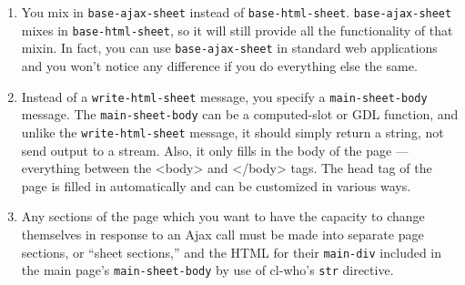 \documentclass [11pt]{book}
\begin{document}
\begin{enumerate}

\item You mix in \texttt{base-ajax-sheet} instead of \texttt{base-html-sheet}. \texttt{base-ajax-sheet} mixes in \texttt{base-html-sheet}, so it will still provide all the functionality of that
   mixin. In fact, you can use \texttt{base-ajax-sheet} in standard web applications and you won't notice any difference if you do
    everything else the same.

\item Instead of a \texttt{write-html-sheet} message, you specify a \texttt{main-sheet-body} message. The \texttt{main-sheet-body}  can be a computed-slot or GDL function,
    and unlike the \texttt{write-html-sheet} message, it should
    simply return a string, not send output to a stream. Also, it only
    fills in the body of the page --- everything between the <body>
    and </body> tags. The head tag of the page is filled in
    automatically and can be customized in various ways.

\item Any sections of the page which you want to have the
      capacity to change themselves in response to an Ajax call must
      be made into separate page sections, or ``sheet sections,'' and
      the HTML for their \texttt{main-div} included in the main
      page's \texttt{main-sheet-body} by use of cl-who's \texttt{str} directive.

\end{enumerate}
\end{document}
